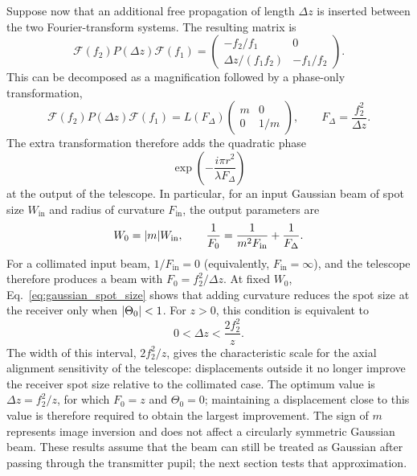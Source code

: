 \documentclass[a4paper,10pt]{article}
\begin{document}
Suppose now that an additional free propagation of length $\Delta z$ is inserted between the two Fourier-transform systems. The resulting matrix is
\begin{equation}
    \mathcal{F}(f_2)P(\Delta z)\mathcal{F}(f_1) = \begin{pmatrix}
        -f_2/f_1 & 0 \\
        \Delta z/(f_1f_2) & -f_1/f_2
    \end{pmatrix}.
\end{equation}
This can be decomposed as a magnification followed by a phase-only transformation,
\begin{equation}
    \mathcal{F}(f_2)P(\Delta z)\mathcal{F}(f_1)
    = L(F_\Delta)\begin{pmatrix} m & 0 \\ 0 & 1/m \end{pmatrix},
    \qquad F_\Delta = \frac{f_2^2}{\Delta z}.
\end{equation}
The extra transformation therefore adds the quadratic phase
\begin{equation}
    \exp\left(-\frac{i\pi r^2}{\lambda F_\Delta}\right)
\end{equation}
at the output of the telescope. In particular, for an input Gaussian beam of spot size $W_{\mathrm{in}}$ and radius of curvature $F_{\mathrm{in}}$, the output parameters are
\begin{equation}
    W_0 = \abs{m}W_{\mathrm{in}}, \qquad
    \frac{1}{F_0} = \frac{1}{m^2F_{\mathrm{in}}} + \frac{1}{F_\Delta}.
\end{equation}
For a collimated input beam, $1/F_{\mathrm{in}}=0$ (equivalently, $F_{\mathrm{in}}=\infty$), and the telescope therefore produces a beam with $F_0 = f_2^2/\Delta z$. At fixed $W_0$, Eq.~\eqref{eq:gaussian_spot_size} shows that adding curvature reduces the spot size at the receiver only when $\abs{\Theta_0}<1$. For $z>0$, this condition is equivalent to
\begin{equation}
    0 < \Delta z < \frac{2f_2^2}{z}.
\end{equation}
The width of this interval, $2f_2^2/z$, gives the characteristic scale for the axial alignment sensitivity of the telescope: displacements outside it no longer improve the receiver spot size relative to the collimated case. The optimum value is $\Delta z = f_2^2/z$, for which $F_0=z$ and $\Theta_0=0$; maintaining a displacement close to this value is therefore required to obtain the largest improvement. The sign of $m$ represents image inversion and does not affect a circularly symmetric Gaussian beam. These results assume that the beam can still be treated as Gaussian after passing through the transmitter pupil; the next section tests that approximation.
\end{document}
